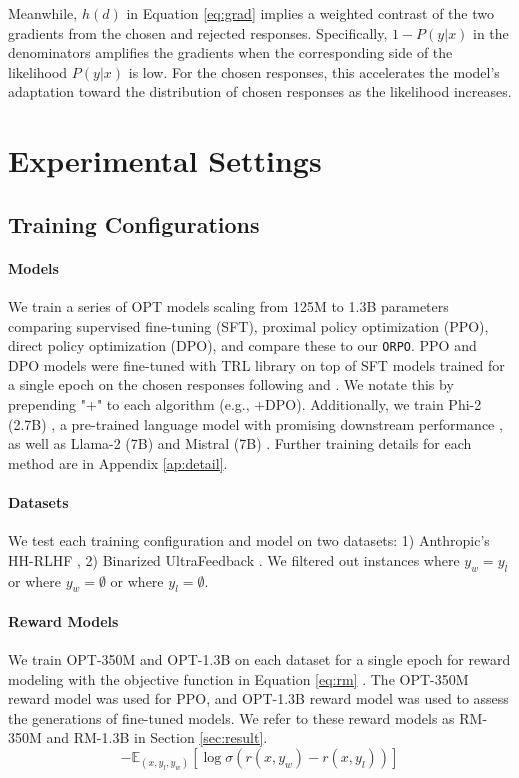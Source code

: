 Meanwhile, $h(d)$ in Equation \ref{eq:grad} implies a weighted contrast of the two gradients from the chosen and rejected responses. Specifically, $1-P(y|x)$ in the denominators amplifies the gradients when the corresponding side of the likelihood $P(y|x)$ is low. For the chosen responses, this accelerates the model's adaptation toward the distribution of chosen responses as the likelihood increases.

\section{Experimental Settings}

\subsection{Training Configurations}
\paragraph{Models} We train a series of OPT models \citep{zhang2022opt} scaling from 125M to 1.3B parameters comparing supervised fine-tuning (SFT), proximal policy optimization (PPO), direct policy optimization (DPO), and compare these to our \texttt{ORPO}. PPO and DPO models were fine-tuned with TRL library \citep{vonwerra2022trl} on top of SFT models trained for a single epoch on the chosen responses following \citet{rafailov2023direct} and \citet{tunstall2023zephyr}. We notate this by prepending "+" to each algorithm (e.g., +DPO). Additionally, we train Phi-2 (2.7B) \citep{Javaheripi_Bubeck_2023}, a pre-trained language model with promising downstream performance \citep{open-llm-leaderboard}, as well as Llama-2 (7B) \citep{touvron2023llama} and Mistral (7B) \citep{jiang2023mistral}.
Further training details for each method are in Appendix \ref{ap:detail}.

\paragraph{Datasets} We test each training configuration and model on two datasets: 1) Anthropic's HH-RLHF \citep{bai2022training}, 2) Binarized UltraFeedback \citep{tunstall2023zephyr}. We filtered out instances where $y_w=y_l$ or where $y_w=\emptyset$ or where $y_l=\emptyset$.

\paragraph{Reward Models} We train OPT-350M and OPT-1.3B on each dataset for a single epoch for reward modeling with the objective function in Equation \ref{eq:rm} \citep{ziegler2020finetuning}. The OPT-350M reward model was used for PPO, and OPT-1.3B reward model was used to assess the generations of fine-tuned models. We refer to these reward models as RM-350M and RM-1.3B in Section \ref{sec:result}.
\begin{equation}
    -\mathbb{E}_{(x, y_l, y_w)} \left[ \log \sigma \left(r(x, y_w) - r(x, y_l) \right) \right]
    \label{eq:rm}
\end{equation}

